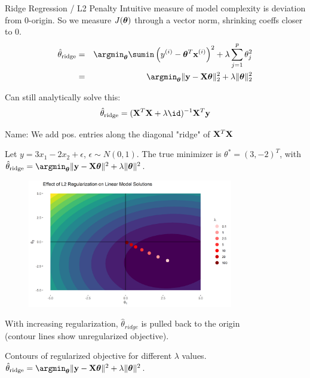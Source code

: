 \documentclass[11pt,compress,t,notes=noshow, xcolor=table]{beamer}
\begin{document}
\begin{vbframe}{Ridge Regression / L2 Penalty}
Intuitive measure of model complexity is deviation from 0-origin. 
So we measure $J(\bm{\theta})$ through a vector norm, shrinking coeffs closer to 0.\\
\vspace{0.2cm}
\begin{eqnarray*}  
\thetah_{\text{ridge}} &=& \argmin_{\thetav} \sumin \left(\yi - \thetav^T \xi \right)^2 + \lambda \sum_{j=1}^{p} \theta_j^2 \\
&=& \argmin_{\thetav} \| \yv - \Xmat \thetav \|_2^2  + \lambda \|\thetav\|_2^2
\end{eqnarray*}

Can still analytically solve this:
$$\thetah_{\text{ridge}} = ({\Xmat}^T \Xmat  + \lambda \id)^{-1} \Xmat^T\yv$$

Name: We add pos. entries along the diagonal "ridge" of $\mathbf{X}^T \mathbf{X}$

\framebreak 

Let $y=3x_{1} -2x_{2} +\epsilon $, $ \epsilon \sim N( 0,1)$. The true minimizer is $\theta ^{*} =( 3,-2)^{T}$, with $ \thetah_{\text{ridge}} = \argmin_{\thetav} \|\yv - \Xmat \thetav\|^2 + \lambda \|\thetav\|^2 $.

\begin{figure}
\includegraphics[width=0.8\textwidth]{figure/lin_model_regu_02.png}
\end{figure}
\vspace{-0.2cm}
{\small With increasing regularization, $\hat{\theta}_{\textit{ridge}}$ is pulled back to the origin\\ (contour lines show unregularized objective).}

\framebreak 
Contours of regularized objective for different $\lambda$ values.\\
$ \thetah_{\text{ridge}} = \argmin_{\thetav} \|\yv - \Xmat \thetav\|^2 + \lambda \|\thetav\|^2 $.


\end{vbframe}
\end{document}
